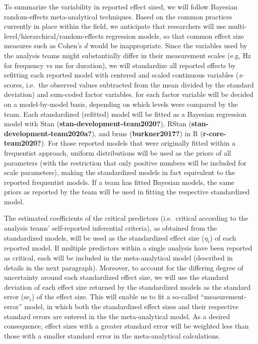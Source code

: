 \documentclass[
  english,
  man,floatsintext]{apa6}
\begin{document}
To summarize the variability in reported effect sized, we will follow Bayesian random-effects meta-analytical techniques.
Based on the common practices currently in place within the field, we anticipate that researchers will use multi-level/hierarchical/random-effects regression models, so that common effect size measures such as Cohen's \(d\) would be inappropriate.
Since the variables used by the analysis teams might substantially differ in their measurement scales (e.g, Hz for frequency vs ms for duration), we will standardize all reported effects by refitting each reported model with centered and scaled continuous variables (\emph{z}-scores, i.e.~the observed values subtracted from the mean divided by the standard deviation) and sum-coded factor variables.
 for each factor variable will be decided on a model-by-model basis, depending on which levels were compared by the team.
Each standardized (refitted) model will be fitted as a Bayesian regression model with Stan (\textbf{stan-development-team2020?}), RStan (\textbf{stan-development-team2020a?}), and brms (\textbf{burkner2017?}) in R (\textbf{r-core-team2020?}).
For those reported models that were originally fitted within a frequentist approach, uniform distributions will be used as the priors of all parameters (with the restriction that only positive numbers will be included for scale parameters), making the standardized models in fact equivalent to the reported frequentist models.
If a team has fitted Bayesian models, the same priors as reported by the team will be used in fitting the respective standardized model.

The estimated coefficients of the critical predictors (i.e.~critical according to the analysis teams' self-reported inferential criteria), as obtained from the standardized models, will be used as the standardized effect size (\(\eta_i\)) of each reported model.
If multiple predictors within a single analysis have been reported as critical, each will be included in the meta-analytical model (described in details in the next paragraph).
Moreover, to account for the differing degree of uncertainty around each standardized effect size, we will use the standard deviation of each effect size returned by the standardized models as the standard error (\(\text{se}_i\)) of the effect size.
This will enable us to fit a so-called ``measurement-error'' model, in which both the standardized effect sizes and their respective standard errors are entered in the the meta-analytical model.
As a desired consequence, effect sizes with a greater standard error will be weighted less than those with a smaller standard error in the meta-analytical calculations.
\end{document}
